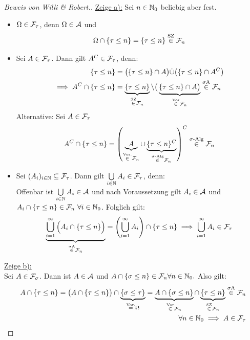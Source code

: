 \begin{proof}[Beweis von Willi \& Robert.]\enter
	\underline{Zeige a):} Sei $n\in\mathbb{N}_0$ beliebig aber fest.
	\begin{itemize} 
		\item $\Omega\in\mathcal{F}_\tau$, denn $\Omega\in\mathcal{A}$ und 
		\begin{align*}
			\Omega\cap\lbrace\tau\leq n\rbrace=\lbrace\tau\leq n\rbrace \stackrel{\text{SZ}}{\in} \mathcal{F}_n
		\end{align*}
		\item Sei $A \in \mathcal{F}_\tau$. Dann gilt $A^C \in \mathcal{F}_\tau$, denn:
		\begin{align*}
			\lbrace\tau\leq n\rbrace &=\big(\lbrace\tau\leq n\rbrace\cap A\big)\dot{\cup}\big(\lbrace\tau\leq n\rbrace\cap A^C\big)\\
			\implies A^C\cap\lbrace\tau\leq n\rbrace&=\underbrace{\lbrace\tau\leq n\rbrace}_{\stackrel{\text{SZ}}{\in}\mathcal{F}_n}\setminus\big(\underbrace{\lbrace\tau\leq n\rbrace\cap A\big)}_{\stackrel{\text{Vor}}{\in}\mathcal{F}_n}\stackrel{\sigma\text{A}}{\in}\mathcal{F}_n
		\end{align*}
		Alternative: Sei $A \in \mathcal{F}_\tau$
		\begin{align*}
			A^C\cap \lbrace \tau \leq n \rbrace = \left(\underbrace{A}_{\stackrel{\text{Vor.}}{\in} \mathcal{F}_n} \cup \underbrace{\lbrace \tau \leq n \rbrace^C}_{\stackrel{\sigma\text{-Alg}}{\in} \mathcal{F}_n} \right)^C \stackrel{\sigma\text{-Alg}}{\in}\mathcal{F}_n
		\end{align*}

		\item Sei $(A_i)_{i\in\mathbb{N}}\subseteq\mathcal{F}_\tau$. 
		Dann gilt $\bigcup\limits_{i\in\mathbb{N}} A_i  \in \mathcal{F}_\tau$, denn:\\
		Offenbar ist $\bigcup\limits_{i\in\mathbb{N}} A_i  \in\mathcal{A}$ und nach Voraussetzung gilt $A_i\in\mathcal{A}$ und\\ $A_i\cap\lbrace\tau\leq n\rbrace\in\mathcal{F}_n~\forall i\in\mathbb{N}_0$. 
		Folglich gilt:
		\begin{align*}
			\underbrace{\bigcup\limits_{i=1}^{\infty} \Big (A_i \cap \{\tau \leq n\} \Big )}_{\stackrel{\sigma\text{A}}{\in} \mathcal{F}_n} = \left( \bigcup\limits_{i=1}^{\infty} A_i \right)\cap \{\tau \leq n\} \implies  \bigcup\limits_{i=1}^{\infty} A_i \in \mathcal{F}_\tau
		\end{align*}
	\end{itemize}

	\underline{Zeige b):}\\
	Sei $A\in\mathcal{F}_\sigma$. 
	Dann ist $A\in\mathcal{A}$ und $A\cap\lbrace\sigma\leq n\rbrace\in\mathcal{F}_n\forall n\in\mathbb{N}_0.$ 
	Also gilt:
	\begin{align*}
		A \cap \lbrace\tau \leq n\rbrace
		\overset{}=
		\big(A \cap\lbrace\tau \leq n\rbrace\big)\cap\underbrace{\lbrace\sigma\leq\tau\rbrace}_{\stackrel{\text{Vor.}}{=}\Omega}
		=\underbrace{A\cap\lbrace\sigma\leq n\rbrace}_{\stackrel{\text{Vor}}{\in}\mathcal{F}_n}\cap\underbrace{\lbrace\tau\leq n\rbrace}_{\stackrel{\text{SZ}}{\in}\mathcal{F}_n} \stackrel{\sigma\text{A}}{\in} \mathcal{F}_n\\ \quad \forall n \in \mathbb{N}_0
		\implies A\in\mathcal{F}_\tau
	\end{align*}


\end{proof}
